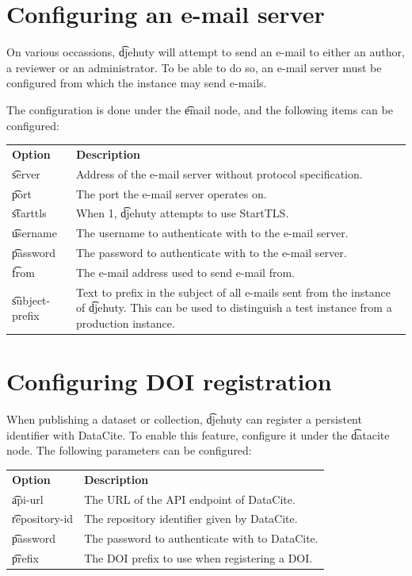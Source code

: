 \section{Configuring an e-mail server}

  On various occassions, \t{djehuty} will attempt to send an e-mail to either
  an author, a reviewer or an administrator.  To be able to do so, an e-mail
  server must be configured from which the instance may send e-mails.

  The configuration is done under the \t{email} node, and the following
  items can be configured:

\begin{tabularx}{\textwidth}{*{1}{!{\VRule[-1pt]}l}!{\VRule[-1pt]}X}
  \headrow
  \textbf{Option}             & \textbf{Description}\\
  \t{server}                  & Address of the e-mail server without protocol
                                specification.\\
  \t{port}                    & The port the e-mail server operates on.\\
  \t{starttls}                & When 1, \t{djehuty} attempts to use StartTLS.\\
  \t{username}                & The username to authenticate with to the
                                e-mail server.\\
  \t{password}                & The password to authenticate with to the
                                e-mail server.\\
  \t{from}                    & The e-mail address used to send e-mail from.\\
  \t{subject-prefix}          & Text to prefix in the subject of all e-mails
                                sent from the instance of \t{djehuty}.  This
                                can be used to distinguish a test instance from
                                a production instance.
\end{tabularx}

\section{Configuring DOI registration}

  When publishing a dataset or collection, \t{djehuty} can register a
  persistent identifier with DataCite.  To enable this feature, configure it
  under the \t{datacite} node. The following parameters can be configured:

\begin{tabularx}{\textwidth}{*{1}{!{\VRule[-1pt]}l}!{\VRule[-1pt]}X}
  \headrow
  \textbf{Option}             & \textbf{Description}\\
  \t{api-url}                 & The URL of the API endpoint of DataCite.\\
  \t{repository-id}           & The repository identifier given by DataCite.\\
  \t{password}                & The password to authenticate with to DataCite.\\
  \t{prefix}                  & The DOI prefix to use when registering a DOI.
\end{tabularx}

